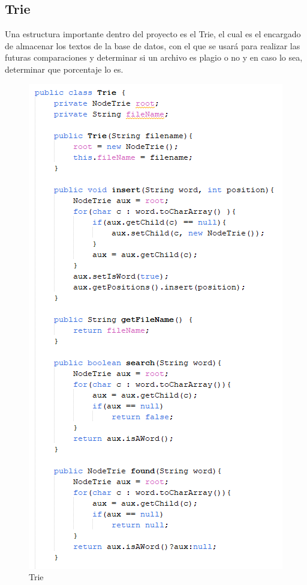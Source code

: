 \documentclass[a4paper]{article}
\begin{document}
\begin{multicols}{2}
\subsection{Trie}
Una estructura importante dentro del proyecto es el Trie, el cual es el encargado de almacenar los textos de la base de datos, con el que se usará para realizar las futuras comparaciones y determinar si un archivo es plagio o no y en caso lo sea, determinar que porcentaje lo es.
\begin{figure}[H]
    \centering
    \includegraphics[width=1\linewidth]{img/Trie.png}
    \caption{Trie}
    \label{fig:enter-label}
\end{figure}


\end{multicols}
\end{document}
